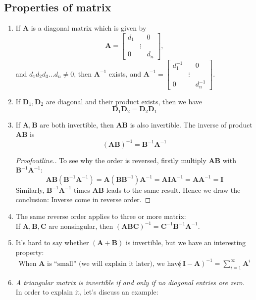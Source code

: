 \subsection{Properties of matrix}
\begin{enumerate}
\item
If $\bm A$ is a diagonal matrix which is given by
\[
\bm A = \begin{bmatrix}
d_1&&0\\
&\vdots&\\
0&&d_n
\end{bmatrix},
\]
and $d_1d_2d_3\dots d_n \ne 0$, then $\bm A^{-1}$ exists, and
$
\bm A^{-1} = \begin{bmatrix}
d_1^{-1}&&0\\
&\vdots&\\
0&&d_n^{-1}
\end{bmatrix}.
$
\item
If $\bm D_1,\bm D_2$ are diagonal and their product exists, then we have
\[
\bm D_1\bm D_2 = \bm D_2\bm D_1
\]
\item
If $\bm A,\bm B$ are both invertible, then $\bm{AB}$ is also invertible. The inverse of product $\bm{AB}$ is 
\[
(\bm{AB})^{-1} = \bm B^{-1}\bm A^{-1}
\]
\begin{proof}[Proofoutline.]
To see why the order is reversed, firstly multiply $\bm{AB}$ with $\bm B^{-1}\bm A^{-1}$:
\[
\bm{AB}(\bm B^{-1}\bm A^{-1}) = \bm{A}(\bm B\bm B^{-1})\bm A^{-1} = \bm A \bm I\bm A^{-1} = \bm A\bm A^{-1} = \bm I
\]
Similarly, $\bm B^{-1}\bm A^{-1}$ times $\bm{AB}$ leads to the same result. Hence we draw the conclusion: Inverse come in reverse order.
\end{proof}
\item
The same reverse order applies to three or more matrix:\\
If $\bm A,\bm B,\bm C$ are nonsingular, then $(\bm{ABC})^{-1} = \bm C^{-1}\bm B^{-1}\bm A^{-1}$.
\item
It's hard to say whether $(\bm A+\bm B)$ is invertible, but we have an interesting property:
\[
\begin{array}{ll}
\mbox{When $\bm A$ is ``small'' (we will explain it later), we have }&
(\bm I-\bm A)^{-1} = \sum_{i=1}^{\infty}\bm A^{i}
\end{array}
\]
\item
\emph{A triangular matrix is invertible if and only if no diagonal entries are zero.}\\
In order to explain it, let's discuss an example:
\begin{example}\qquad\\

\end{example}
\end{enumerate}
